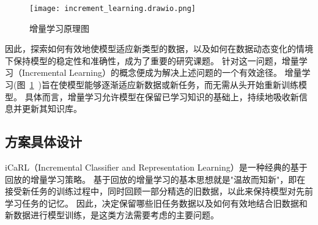 \begin{figure}[htbp]
  \centering
  \texttt{[image: increment\_learning.drawio.png]}
  \caption{增量学习原理图}
  \label{fig:incremental_learning}
\end{figure}
因此，探索如何有效地使模型适应新类型的数据，以及如何在数据动态变化的情境下保持模型的稳定性和准确性，成为了重要的研究课题。
针对这一问题，增量学习（Incremental Learning）的概念便成为解决上述问题的一个有效途径。
增量学习(图~\ref{fig:incremental_learning}~)旨在使模型能够逐渐适应新数据或新任务，而无需从头开始重新训练模型。
具体而言，增量学习允许模型在保留已学习知识的基础上，持续地吸收新信息并更新其知识库。

\subsection{方案具体设计}
iCaRL（Incremental Classifier and Representation Learning）\cite{rebuffi2017icarl}是一种经典的基于回放的增量学习策略。
基于回放的增量学习的基本思想就是"温故而知新"，即在接受新任务的训练过程中，同时回顾一部分精选的旧数据，以此来保持模型对先前学习任务的记忆。
因此，决定保留哪些旧任务数据以及如何有效地结合旧数据和新数据进行模型训练，是这类方法需要考虑的主要问题。\par


